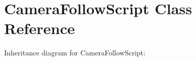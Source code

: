 \hypertarget{class_camera_follow_script}{}\section{Camera\+Follow\+Script Class Reference}
\label{class_camera_follow_script}


Inheritance diagram for Camera\+Follow\+Script\+:

